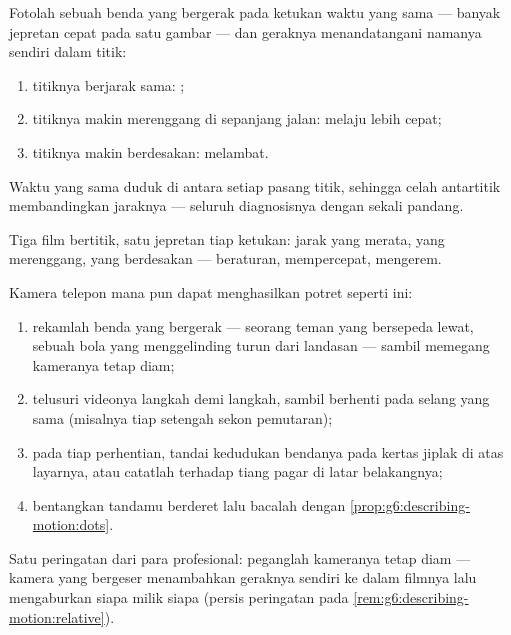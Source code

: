 \begin{proposition}\label{prop:g6:describing-motion:dots}
Fotolah sebuah benda yang bergerak pada ketukan waktu yang sama ---
banyak jepretan cepat pada satu gambar --- dan geraknya menandatangani
namanya sendiri dalam titik:
\begin{enumerate}
  \item titiknya berjarak sama: ;
  \item titiknya makin merenggang di sepanjang jalan: melaju lebih
        cepat;
  \item titiknya makin berdesakan: melambat.
\end{enumerate}
Waktu yang sama duduk di antara setiap pasang titik, sehingga celah
antartitik membandingkan jaraknya --- seluruh diagnosisnya dengan
sekali pandang.
\end{proposition}

\begin{omfigure}

{\small Tiga film bertitik, satu jepretan tiap ketukan: jarak yang
merata, yang merenggang, yang berdesakan --- beraturan, mempercepat,
mengerem.}
\end{omfigure}

\begin{method}\label{met:g6:describing-motion:film}
Kamera telepon mana pun dapat menghasilkan potret seperti ini:
\begin{enumerate}
  \item rekamlah benda yang bergerak --- seorang teman yang
        bersepeda lewat, sebuah bola yang menggelinding turun dari
        landasan --- sambil memegang kameranya tetap diam;
  \item telusuri videonya langkah demi langkah, sambil berhenti pada
        selang yang sama (misalnya tiap setengah sekon pemutaran);
  \item pada tiap perhentian, tandai kedudukan bendanya pada kertas
        jiplak di atas layarnya, atau catatlah terhadap tiang pagar
        di latar belakangnya;
  \item bentangkan tandamu berderet lalu bacalah dengan
        \cref{prop:g6:describing-motion:dots}.
\end{enumerate}
Satu peringatan dari para profesional: peganglah kameranya tetap diam
--- kamera yang bergeser menambahkan geraknya sendiri ke dalam filmnya
lalu mengaburkan  siapa milik siapa (persis peringatan pada
\cref{rem:g6:describing-motion:relative}).
\end{method}

